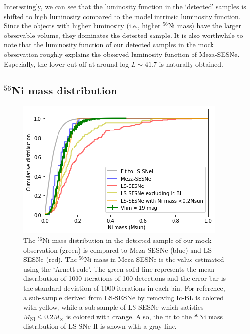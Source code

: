 \documentclass[twocolumn, linenumbers]{aastex62}
\begin{document}
Interestingly, we can see that the luminosity function in the `detected' samples is shifted to high luminosity compared to the model intrinsic luminosity function. Since the objects with higher luminosity (i.e., higher $^{56}$Ni mass) have the larger observable volume, they dominates the detected sample.
It is also worthwhile to note that the luminosity function of our detected samples in the mock observation roughly explains the observed luminosity function of Meza-SESNe. Especially, the lower cut-off at around log $L \sim 41.7$ is naturally obtained. 


\subsection{$^{56}$Ni mass distribution} \label{sec:Nimass_moock}
\begin{figure}[htbp]
	\includegraphics[width=\columnwidth]{Ni_dist_compare_19_to_data.png}
    \caption{The $^{56}$Ni mass distribution in the detected sample of our mock observation (green) is compared to Meza-SESNe (blue) and LS-SESNe (red). The $^{56}$Ni mass in Meza-SESNe is the value estimated using the `Arnett-rule'. The green solid line represents the mean distribution of 1000 iterations of 100 detections and the error bar is the standard deviation of 1000 iterations in each bin. For reference, a sub-sample derived from LS-SESNe by removing Ic-BL is colored with yellow, while a sub-sample of LS-SESNe which satisfies $M_{\mathrm{Ni}} \leq  0.2M_{\odot}$ is colored with orange. Also, the fit to the $^{56}$Ni mass distribution  of LS-SNe II is shown with a gray line.} 
     \label{Ni_dist_mock_compare_19_to_data}
\end{figure}
\end{document}
